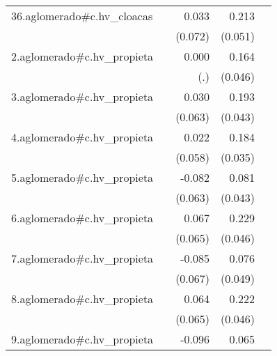 {\begin{longtable}{l*{4}{D{.}{.}{-1}}}
\addlinespace
36.aglomerado#c.hv\_cloacas&                     &       0.033         &       0.213\sym{***}&                     \\
            &                     &     (0.072)         &     (0.051)         &                     \\
\addlinespace
2.aglomerado#c.hv\_propieta&                     &       0.000         &       0.164\sym{***}&                     \\
            &                     &         (.)         &     (0.046)         &                     \\
\addlinespace
3.aglomerado#c.hv\_propieta&                     &       0.030         &       0.193\sym{***}&                     \\
            &                     &     (0.063)         &     (0.043)         &                     \\
\addlinespace
4.aglomerado#c.hv\_propieta&                     &       0.022         &       0.184\sym{***}&                     \\
            &                     &     (0.058)         &     (0.035)         &                     \\
\addlinespace
5.aglomerado#c.hv\_propieta&                     &      -0.082         &       0.081         &                     \\
            &                     &     (0.063)         &     (0.043)         &                     \\
\addlinespace
6.aglomerado#c.hv\_propieta&                     &       0.067         &       0.229\sym{***}&                     \\
            &                     &     (0.065)         &     (0.046)         &                     \\
\addlinespace
7.aglomerado#c.hv\_propieta&                     &      -0.085         &       0.076         &                     \\
            &                     &     (0.067)         &     (0.049)         &                     \\
\addlinespace
8.aglomerado#c.hv\_propieta&                     &       0.064         &       0.222\sym{***}&                     \\
            &                     &     (0.065)         &     (0.046)         &                     \\
\addlinespace
9.aglomerado#c.hv\_propieta&                     &      -0.096         &       0.065         &                     \\

\end{longtable}}
